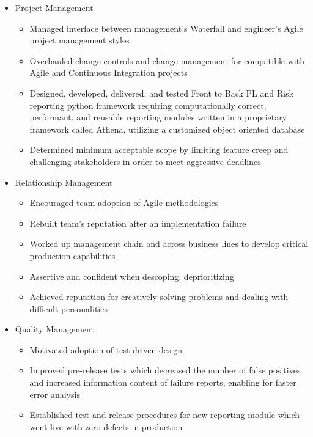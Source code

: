 \begin{itemize}
    \item{Project Management}
        \begin{itemize}
            \item Managed interface between management's Waterfall and engineer's Agile project management styles
            \item Overhauled change controls and change management for compatible with Agile and Continuous Integration projects
            \item Designed, developed, delivered, and tested Front to Back PL and Risk reporting python framework requiring computationally correct, performant, and reusable reporting modules written in a proprietary framework called Athena, utilizing a customized object oriented database\footnotemark
            \item Determined minimum acceptable scope by limiting feature creep and challenging stakeholders in order to meet aggressive deadlines
        \end{itemize}
    \item{Relationship Management}
        \begin{itemize}
            \item Encouraged team adoption of Agile methodologies
            \item Rebuilt team's reputation after an implementation failure
            \item Worked up management chain and across business lines to develop critical production capabilities
            \item Assertive and confident when descoping, deprioritizing
            \item Achieved reputation for creatively solving problems and dealing with difficult personalities
        \end{itemize}

    \item{Quality Management}
        \begin{itemize}
            \item Motivated adoption of test driven design
            \item Improved pre-release tests which decreased the number of false positives and increased information content of failure reports, enabling for faster error analysis
            \item Established test and release procedures for new reporting module which went live with zero defects in production\newline{}
        \end{itemize}
\end{itemize}

